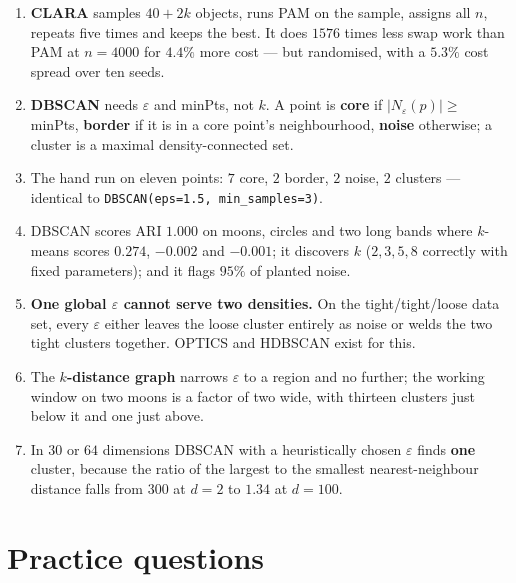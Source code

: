 \documentclass[11pt]{article}
\begin{document}
\begin{enumerate}[leftmargin=*]
    $O(k(n-k)^2)$ and it needs $O(n^2)$ memory. Measured: $98\times$ slower
    than $k$-means at $n = 4000$, growth exponent $2.34$.
  \item \textbf{CLARA} samples $40+2k$ objects, runs PAM on the sample,
    assigns all $n$, repeats five times and keeps the best. It does $1576$
    times less swap work than PAM at $n = 4000$ for $4.4\%$ more cost ---
    but randomised, with a $5.3\%$ cost spread over ten seeds.
  \item \textbf{DBSCAN} needs $\varepsilon$ and minPts, not $k$. A point is
    \textbf{core} if $|N_\varepsilon(p)| \ge$ minPts, \textbf{border} if it
    is in a core point's neighbourhood, \textbf{noise} otherwise; a cluster
    is a maximal density-connected set.
  \item The hand run on eleven points: $7$ core, $2$ border, $2$ noise,
    $2$ clusters --- identical to \texttt{DBSCAN(eps=1.5, min\_samples=3)}.
  \item DBSCAN scores ARI $1.000$ on moons, circles and two long bands where
    $k$-means scores $0.274$, $-0.002$ and $-0.001$; it discovers $k$
    ($2,3,5,8$ correctly with fixed parameters); and it flags $95\%$ of
    planted noise.
  \item \textbf{One global $\varepsilon$ cannot serve two densities.} On the
    tight/tight/loose data set, every $\varepsilon$ either leaves the loose
    cluster entirely as noise or welds the two tight clusters together.
    OPTICS and HDBSCAN exist for this.
  \item The \textbf{$k$-distance graph} narrows $\varepsilon$ to a region and
    no further; the working window on two moons is a factor of two wide, with
    thirteen clusters just below it and one just above.
  \item In $30$ or $64$ dimensions DBSCAN with a heuristically chosen
    $\varepsilon$ finds \textbf{one} cluster, because the ratio of the
    largest to the smallest nearest-neighbour distance falls from $300$ at
    $d = 2$ to $1.34$ at $d = 100$.
\end{enumerate}

\section{Practice questions}
\label{sec:practice}
\end{document}
